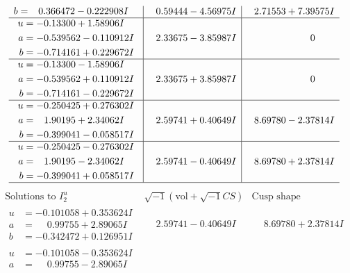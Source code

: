 \documentclass[1p]{elsarticle_modified}
\theoremstyle{definition}
\newcommand{\I}{\sqrt{-1}}
\begin{document}
$$\begin{array}{c|c|c}
\begin{aligned}
b &= \phantom{-}0.366472 - 0.222908 I\end{aligned}
 & \phantom{-}0.59444 - 4.56975 I & \phantom{-}2.71553 + 7.39575 I \\ \hline\begin{aligned}
u &= -0.13300 + 1.58906 I \\
a &= -0.539562 - 0.110912 I \\
b &= -0.714161 + 0.229672 I\end{aligned}
 & \phantom{-}2.33675 - 3.85987 I & \phantom{-0.000000 } 0 \\ \hline\begin{aligned}
u &= -0.13300 - 1.58906 I \\
a &= -0.539562 + 0.110912 I \\
b &= -0.714161 - 0.229672 I\end{aligned}
 & \phantom{-}2.33675 + 3.85987 I & \phantom{-0.000000 } 0 \\ \hline\begin{aligned}
u &= -0.250425 + 0.276302 I \\
a &= \phantom{-}1.90195 + 2.34062 I \\
b &= -0.399041 - 0.058517 I\end{aligned}
 & \phantom{-}2.59741 + 0.40649 I & \phantom{-}8.69780 - 2.37814 I \\ \hline\begin{aligned}
u &= -0.250425 - 0.276302 I \\
a &= \phantom{-}1.90195 - 2.34062 I \\
b &= -0.399041 + 0.058517 I\end{aligned}
 & \phantom{-}2.59741 - 0.40649 I & \phantom{-}8.69780 + 2.37814 I\\
 \hline 
 \end{array}$$\newpage$$\begin{array}{c|c|c}  
\text{Solutions to }I^u_{2}& \I (\text{vol} + \sqrt{-1}CS) & \text{Cusp shape}\\
 \hline 
\begin{aligned}
u &= -0.101058 + 0.353624 I \\
a &= \phantom{-}0.99755 + 2.89065 I \\
b &= -0.342472 + 0.126951 I\end{aligned}
 & \phantom{-}2.59741 - 0.40649 I & \phantom{-}8.69780 + 2.37814 I \\ \hline\begin{aligned}
u &= -0.101058 - 0.353624 I \\
a &= \phantom{-}0.99755 - 2.89065 I \\

\end{aligned}
\end{array}$$
\end{document}
